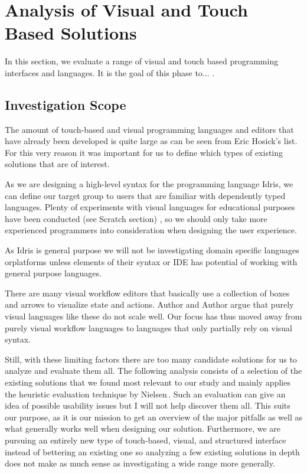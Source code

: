 \section{Analysis of Visual and Touch Based Solutions}
\label{sec:Analysis}
In this section, we evaluate a range of visual and touch based programming interfaces and languages. It is the goal of this phase
to... .

\subsection{Investigation Scope}
The amount of touch-based and visual programming languages and editors that have already been developed is quite large as can be seen from Eric Hosick's list.\,\cite{hosick2014} For this very reason it was important for us to define which types of existing solutions that are of interest.

As we are designing a high-level syntax for the programming language Idris, we can define our target group to users that are familiar with dependently typed languages. Plenty of experiments with visual languages for educational purposes have been conducted (see Scratch section) , so we should only take more experienced programmers into consideration when designing the user experience.

As Idris is general purpose we will not be investigating domain specific languages orplatforms unless elements of their syntax or IDE has potential of working with general purpose languages.

There are many visual workflow editors that basically use a collection of boxes and arrows to visualize state and actions. Author and Author  argue that purely visual languages like these do not scale well. Our focus has thus moved away from purely visual workflow languages to languages that only partially rely on visual syntax.

Still, with these limiting factors there are too many candidate solutions for us to analyze and evaluate them all. The following analysis consists of a selection of the existing solutions that we found most relevant to our study and mainly applies the heuristic evaluation technique by Nielsen\,\cite{nielsen1990heuristic}. Such an evaluation can give an idea of possible usability issues but I will not help discover them all. This suits our purpose, as it is our mission to get an overview of the major pitfalls as well as what generally works well when designing our solution. Furthermore, we are pursuing an entirely new type of touch-based, visual, and structured interface instead of bettering an existing one so analyzing a few existing solutions in depth does not make as much sense
as investigating a wide range more generally.

